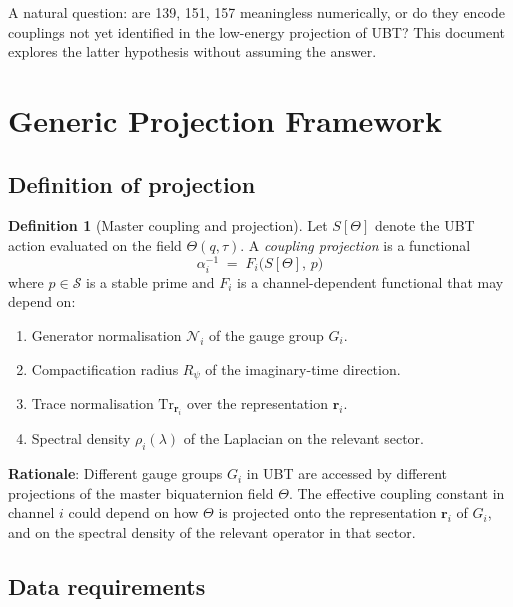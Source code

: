 \documentclass[12pt,a4paper]{article}
\theoremstyle{definition}
\newtheorem{definition}[proposition]{Definition}
\theoremstyle{remark}
\begin{document}
A natural question: are 139, 151, 157 meaningless numerically, or do they
encode couplings not yet identified in the low-energy projection of UBT?
This document explores the latter hypothesis without assuming the answer.

\section{Generic Projection Framework}

\subsection{Definition of projection}

\begin{definition}[Master coupling and projection]
Let $S[\Theta]$ denote the UBT action evaluated on the field $\Theta(q,\tau)$.
A \emph{coupling projection} is a functional
\begin{equation}
  \alpha_i^{-1} \;=\; F_i\!\bigl(S[\Theta],\, p\bigr)
  \label{eq:projection_generic}
\end{equation}
where $p \in \mathcal{S}$ is a stable prime and $F_i$ is a channel-dependent
functional that may depend on:
\begin{enumerate}
\item Generator normalisation $\mathcal{N}_i$ of the gauge group $G_i$.
\item Compactification radius $R_\psi$ of the imaginary-time direction.
\item Trace normalisation $\mathrm{Tr}_{\mathbf{r}_i}$ over the representation $\mathbf{r}_i$.
\item Spectral density $\rho_i(\lambda)$ of the Laplacian on the relevant sector.
\end{enumerate}
\end{definition}

\textbf{Rationale}: Different gauge groups $G_i$ in UBT are accessed by different
projections of the master biquaternion field $\Theta$.  The effective coupling
constant in channel $i$ could depend on how $\Theta$ is projected onto the
representation $\mathbf{r}_i$ of $G_i$, and on the spectral density of the
relevant operator in that sector.

\subsection{Data requirements}
\end{document}
